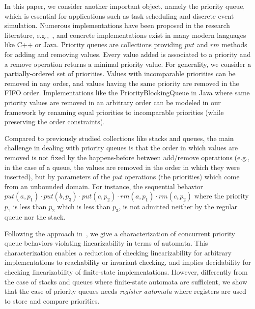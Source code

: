 In this paper, we consider another important object, namely the priority queue, which is essential for applications such as task scheduling and discrete event simulation. Numerous implementations have been proposed in the research literature, e.g.,~\cite{DBLP:conf/ppopp/AlistarhKLS15,DBLP:conf/wdag/CalciuMH14,DBLP:conf/opodis/LindenJ13,DBLP:conf/podc/ShavitZ99,DBLP:conf/ipps/ShavitL00}, and concrete implementations exist in many modern languages like C++ or Java.
%
%
Priority queues are collections providing $\textit{put}$ and $\textit{rm}$ methods for adding and removing values. Every value added is associated to a priority and a remove operation returns a minimal priority value. For generality, we consider a partially-ordered set of priorities. Values with incomparable priorities can be removed in any order, and values having the same priority are removed in the FIFO order. Implementations like the PriorityBlockingQueue in Java where same priority values are removed in an arbitrary order can be modeled in our framework by renaming equal priorities to incomparable priorities (while preserving the order constraints).

Compared to previously studied collections like stacks and queues, the main challenge in dealing with priority queues is that the order in which values are removed is not fixed by the happens-before between add/remove operations (e.g., in the case of a queue, the values are removed in the order in which they were inserted), but by parameters of the $\textit{put}$ operations (the priorities) which come from an unbounded domain. For instance, the sequential behavior $\textit{put}(a,p_1)\cdot \textit{put}(b,p_3)\cdot \textit{put}(c,p_2)\cdot \textit{rm}(a,p_1)\cdot \textit{rm}(c,p_2)$ where the priority $p_1$ is less than $p_2$ which is less than $p_3$, is not admitted neither by the regular queue nor the stack.



Following the approach in~\cite{DBLP:conf/icalp/BouajjaniEEH15}, we give a characterization of concurrent priority queue behaviors violating linearizability in terms of automata. This characterization enables a reduction of checking linearizability for arbitrary implementations to reachability or invariant checking, and implies decidability for checking linearizability of finite-state implementations. However, differently from the case of stacks and queues where finite-state automata are sufficient, we show that the case of priority queues needs \emph{register automata} where registers are used to store and compare priorities.

